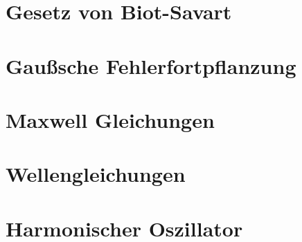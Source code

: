 



  \maketitle
  \tableofcontents
  \newpage

    \section{Gesetz von Biot-Savart}
      

    \section{Gaußsche Fehlerfortpflanzung}
      

    \section{Maxwell Gleichungen}
      

    \section{Wellengleichungen}
      

    \section{Harmonischer Oszillator}
      



